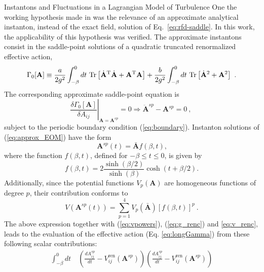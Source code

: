 \begin{chapter}{Instantons and Fluctuations in a Lagrangian Model of Turbulence}
One the working hypothesis made in \textcite{moriconi2014} was the relevance of an approximate analytical instanton, instead of the exact field, solution of Eq.~\ref{eq:rfd-saddle}. In this work, the applicability of this hypothesis was verified. The approximate instantons consist in the saddle-point solutions of a quadratic truncated renormalized effective action,
\begin{equation} \label{eq:gamma_quadratic}
 \Gamma_0[{\mathbf{A}}] \equiv \frac{a}{2 g^2} \int_{-\beta}^0 d t \ \mathrm{Tr}
 \left[\dot {\mathbf{A}}^\T \dot {\mathbf{A}} + {\mathbf{A}}^\T {\mathbf{A}} \right] +
 \frac{b}{2 g^2} \int_{-\beta}^0 d t \ \mathrm{Tr} \left[\dot {\mathbf{A}}^2 + {\mathbf{A}}^2 \right] \ .
\end{equation}
The corresponding approximate saddle-point equation is
\begin{equation}\label{eq:approx_EOM}
 \left. \frac{\delta \Gamma_0[{\mathbf{A}}]}{\delta A_{ij}} \right|_{{\mathbf{A}}={\mathbf{A}}^{sp}} = 0 \Rightarrow  \ddot {\mathbf{A}}^{sp} - {\mathbf{A}}^{sp} = 0
\ ,\ 
\end{equation}
subject to the periodic boundary condition (\ref{eq:boundary}).
Instanton solutions of (\ref{eq:approx_EOM}) have the form
\begin{equation} \label{eq:analytical_instanton}
 {\mathbf{A}}^{sp} (t) = \bar {\mathbf{A}} f(\beta, t) \mbox{,}
\end{equation}
where the function $f(\beta,t)$, defined for $-\beta \leq t \leq 0$, is given by
\begin{equation}
 f(\beta, t) = 2 \frac{\sinh(\beta/2)}{\sinh(\beta)} \cosh(t + \beta/2) \mbox{.}
\end{equation}
Additionally, since the potential functions $V_p({\mathbf{A}})$ are homogeneous functions of degree $p$, their contribution conforms to
\begin{equation}
 V({\mathbf{A}}^{sp}(t)) = \sum_{p = 1}^4 V_p (\bar {\mathbf{A}}) [ f(\beta,t) ]^p \ .
\end{equation}
The above expression together with (\ref{eq:vpowers}), (\ref{eq:g_renc}) and \eqref{eq:v_renc}, leads to the evaluation of the effective action (Eq. \ref{eq:longGamma}) from these following scalar contributions:
\begin{equation}
\begin{split}
\int_{-\beta}^0 dt \ &\left( \frac{d A_{ij}^{sp}}{dt} - V_{ij}^{\mathrm{ren}}(\mathbf{A}^{sp}) \right) \left( \frac{d A_{ij}^{sp}}{dt} - V_{ij}^{\mathrm{ren}}(\mathbf{A}^{sp}) \right)

\end{split}
\end{equation}
\end{chapter}
